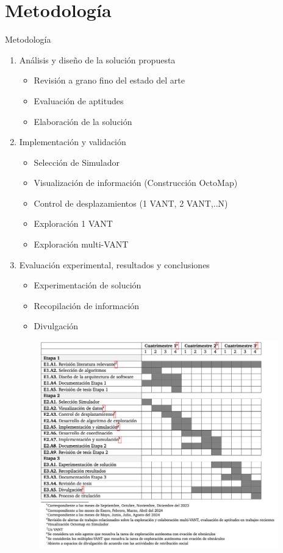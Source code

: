 \documentclass[
	12pt, %
	aspectratio=169, %
]{beamer}
\begin{document}
\section{Metodología}
\begin{frame}{Metodología}

  \begin{enumerate}
  \item <1-> Análisis y diseño de la solución propuesta 
    \begin{itemize}
    \item Revisión a grano fino del estado del arte
    \item Evaluación de aptitudes
    \item Elaboración de la solución
    \end{itemize}
  \item <2-> Implementación y validación
    \begin{itemize}
    \item Selección de Simulador
    \item Visualización de información (Construcción OctoMap)
    \item Control de desplazamientos (1 VANT, 2 VANT,..N)
    \item Exploración 1 VANT
    \item Exploración multi-VANT
    \end{itemize}
  \item <3-> Evaluación experimental, resultados y conclusiones
    \begin{itemize}
    \item Experimentación de solución
    \item Recopilación de información
    \item Divulgación
    \end{itemize}
  \end{enumerate}  
\end{frame}

\begin{frame}
  \begin{figure}
    \centering
    \includegraphics[width=12cm, height=9cm]{cronograma}
  \end{figure}
\end{frame}
\end{document}
